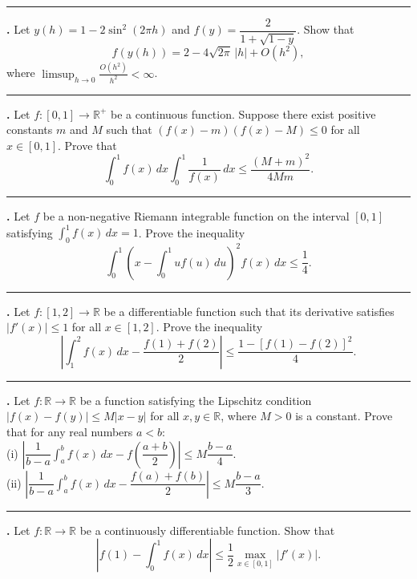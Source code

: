 \documentclass[11pt]{article}
\newcounter{probnum}
\newenvironment{problembox}{\par\noindent\rule{\linewidth}{0.5pt}\vspace{5pt}\par}{\vspace{2pt}}
\begin{document}
\begin{problembox}
\textbf{\theprobnum.} Let $y(h) = 1 - 2\sin^2(2\pi h)$ and $f(y) = \dfrac{2}{1+\sqrt{1-y}}$. Show that
\[
f(y(h)) = 2 - 4\sqrt{2\pi}\,|h| + O(h^2),
\]
where $\displaystyle\limsup_{h \to 0} \frac{O(h^2)}{h^2} < \infty$.
\end{problembox}

\begin{problembox}
\textbf{\theprobnum.} Let $f : [0,1] \to \mathbb{R}^+$ be a continuous function. Suppose there exist positive constants $m$ and $M$ such that $(f(x)-m)(f(x)-M) \le 0$ for all $x \in [0,1]$. Prove that
\[
\int_0^1 f(x)\,dx \int_0^1 \frac{1}{f(x)}\,dx \le \frac{(M+m)^2}{4Mm}.
\]
\end{problembox}

\begin{problembox}
\textbf{\theprobnum.} Let $f$ be a non-negative Riemann integrable function on the interval $[0,1]$ satisfying $\displaystyle\int_0^1 f(x)\,dx = 1$. Prove the inequality
\[
\int_0^1 \left(x - \int_0^1 u f(u)\,du\right)^2 f(x)\,dx \le \frac{1}{4}.
\]
\end{problembox}

\begin{problembox}
\textbf{\theprobnum.} Let $f : [1,2] \to \mathbb{R}$ be a differentiable function such that its derivative satisfies $|f'(x)| \le 1$ for all $x \in [1,2]$. Prove the inequality
\[
\left|\int_1^2 f(x)\,dx - \frac{f(1)+f(2)}{2}\right| \le \frac{1 - [f(1)-f(2)]^2}{4}.
\]
\end{problembox}

\begin{problembox}
\textbf{\theprobnum.} Let $f : \mathbb{R} \to \mathbb{R}$ be a function satisfying the Lipschitz condition $|f(x)-f(y)| \le M|x-y|$ for all $x,y \in \mathbb{R}$, where $M > 0$ is a constant. Prove that for any real numbers $a < b$:\\
(i) $\left|\dfrac{1}{b-a}\displaystyle\int_a^b f(x)\,dx - f\left(\dfrac{a+b}{2}\right)\right| \le M \dfrac{b-a}{4}$.\\
(ii) $\left|\dfrac{1}{b-a}\displaystyle\int_a^b f(x)\,dx - \dfrac{f(a)+f(b)}{2}\right| \le M \dfrac{b-a}{3}$.
\end{problembox}

\begin{problembox}
\textbf{\theprobnum.} Let $f : \mathbb{R} \to \mathbb{R}$ be a continuously differentiable function. Show that
\[
\left|f(1) - \int_0^1 f(x)\,dx\right| \le \frac{1}{2} \max_{x \in [0,1]} |f'(x)|.
\]
\end{problembox}
\end{document}
